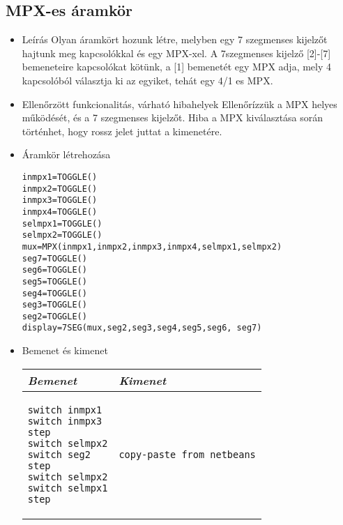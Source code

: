 \subsection{MPX-es áramkör}
\begin{itemize}
\item Leírás\newline
Olyan áramkört hozunk létre, melyben egy 7 szegmenses kijelzőt hajtunk meg kapcsolókkal és egy MPX-xel. A 7szegmenses kijelző [2]-[7] bemeneteire kapcsolókat kötünk, a [1] bemenetét egy MPX adja, mely 4 kapcsolóból választja ki az egyiket, tehát egy 4/1 es MPX.
\item Ellenőrzött funkcionalitás, várható hibahelyek\newline
Ellenőrízzük a MPX helyes működését, és a 7 szegmenses kijelzőt. Hiba a MPX kiválasztása során történhet, hogy rossz jelet juttat a kimenetére.

\item Áramkör létrehozása

\begin{verbatim}
inmpx1=TOGGLE()
inmpx2=TOGGLE()
inmpx3=TOGGLE()
inmpx4=TOGGLE()
selmpx1=TOGGLE()
selmpx2=TOGGLE()
mux=MPX(inmpx1,inmpx2,inmpx3,inmpx4,selmpx1,selmpx2)
seg7=TOGGLE()
seg6=TOGGLE()
seg5=TOGGLE()
seg4=TOGGLE()
seg3=TOGGLE()
seg2=TOGGLE()
display=7SEG(mux,seg2,seg3,seg4,seg5,seg6, seg7)
\end{verbatim}

\item Bemenet és kimenet\newline

\begin{tabular}{|p{5cm}|p{5cm}|} 
\hline 
\textit{Bemenet} & \textit{Kimenet} \\ \hline
\begin{verbatim}
switch inmpx1
switch inmpx3
step
switch selmpx2
switch seg2
step
switch selmpx2
switch selmpx1
step
\end{verbatim}
& 
\begin{verbatim}
copy-paste from netbeans
\end{verbatim}
\\ \hline
\end{tabular}

\end{itemize}

